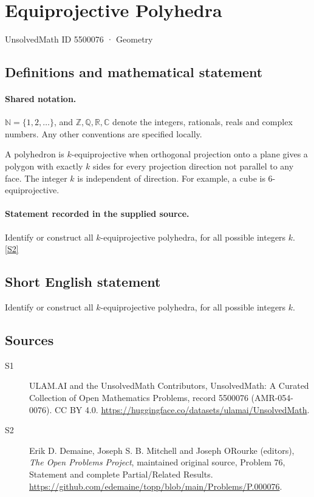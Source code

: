 \documentclass[11pt]{article}
\newcommand{\sref}[2]{\hyperlink{source:#1:#2}{[S#2]}}
\begin{document}
\setcounter{section}{5500075}
\section{Equiprojective Polyhedra}\label{5500076}
{\small\sffamily UnsolvedMath ID 5500076 · Geometry}
\subsection{Definitions and mathematical statement}

\paragraph{Shared notation.}$\mathbb N=\{1,2,\ldots\}$, and $\mathbb Z,\mathbb Q,\mathbb R,\mathbb C$ denote the integers, rationals, reals and complex numbers. Any other conventions are specified locally.


A polyhedron is $k$-equiprojective when orthogonal projection onto a plane gives a polygon with exactly $k$ sides for every projection direction not parallel to any face. The integer $k$ is independent of direction. For example, a cube is $6$-equiprojective.
\paragraph{Statement recorded in the supplied source.}
Identify or construct all $k$-equiprojective polyhedra, for all possible integers $k$. \sref{5500076}{2}
\subsection{Short English statement}
Identify or construct all $k$-equiprojective polyhedra, for all possible integers $k$.
\subsection{Sources}
\begin{description}
\item[\hypertarget{source:5500076:1}{S1}] ULAM.AI and the UnsolvedMath Contributors, UnsolvedMath: A Curated Collection of Open Mathematics Problems, record 5500076 (AMR-054-0076). CC BY 4.0. \url{https://huggingface.co/datasets/ulamai/UnsolvedMath}.
\item[\hypertarget{source:5500076:2}{S2}] Erik D. Demaine, Joseph S. B. Mitchell and Joseph O\textquotesingle Rourke (editors), \emph{The Open Problems Project}, maintained original source, Problem 76, Statement and complete Partial/Related Results. \url{https://github.com/edemaine/topp/blob/main/Problems/P.000076}.
\end{description}
\label{end:5500076}
\end{document}
